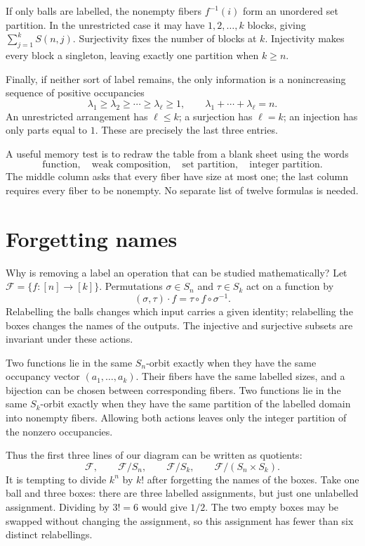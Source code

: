 If only balls are labelled, the nonempty fibers \(f^{-1}(i)\) form an unordered set partition. In the unrestricted case it may have \(1,2,\ldots,k\) blocks, giving \(\sum_{j=1}^kS(n,j)\). Surjectivity fixes the number of blocks at \(k\). Injectivity makes every block a singleton, leaving exactly one partition when \(k\ge n\).

Finally, if neither sort of label remains, the only information is a nonincreasing sequence of positive occupancies
\[
 \lambda_1\ge\lambda_2\ge\cdots\ge\lambda_\ell\ge1,
 \qquad \lambda_1+\cdots+\lambda_\ell=n.
\]
An unrestricted arrangement has \(\ell\le k\); a surjection has \(\ell=k\); an injection has only parts equal to \(1\). These are precisely the last three entries.

\begin{remark}
A useful memory test is to redraw the table from a blank sheet using the words
\[
 \text{function},\quad
 \text{weak composition},\quad
 \text{set partition},\quad
 \text{integer partition}.
\]
The middle column asks that every fiber have size at most one; the last column requires every fiber to be nonempty. No separate list of twelve formulas is needed.
\end{remark}

\section{Forgetting names}

Why is removing a label an operation that can be studied mathematically? Let
\(\mathcal F=\{f:[n]\to[k]\}\). Permutations \(\sigma\in S_n\) and \(\tau\in S_k\) act on a function by
\[
 (\sigma,\tau)\cdot f=\tau\circ f\circ\sigma^{-1}.
\]
Relabelling the balls changes which input carries a given identity; relabelling the boxes changes the names of the outputs. The injective and surjective subsets are invariant under these actions.

Two functions lie in the same \(S_n\)-orbit exactly when they have the same occupancy vector \((a_1,\ldots,a_k)\). Their fibers have the same labelled sizes, and a bijection can be chosen between corresponding fibers. Two functions lie in the same \(S_k\)-orbit exactly when they have the same partition of the labelled domain into nonempty fibers. Allowing both actions leaves only the integer partition of the nonzero occupancies.

Thus the first three lines of our diagram can be written as quotients:
\[
 \mathcal F,\qquad \mathcal F/S_n,\qquad
 \mathcal F/S_k,\qquad
 \mathcal F/(S_n\times S_k).
\]
It is tempting to divide \(k^n\) by \(k!\) after forgetting the names of the boxes. Take one ball and three boxes: there are three labelled assignments, but just one unlabelled assignment. Dividing by \(3!=6\) would give \(1/2\). The two empty boxes may be swapped without changing the assignment, so this assignment has fewer than six distinct relabellings.

